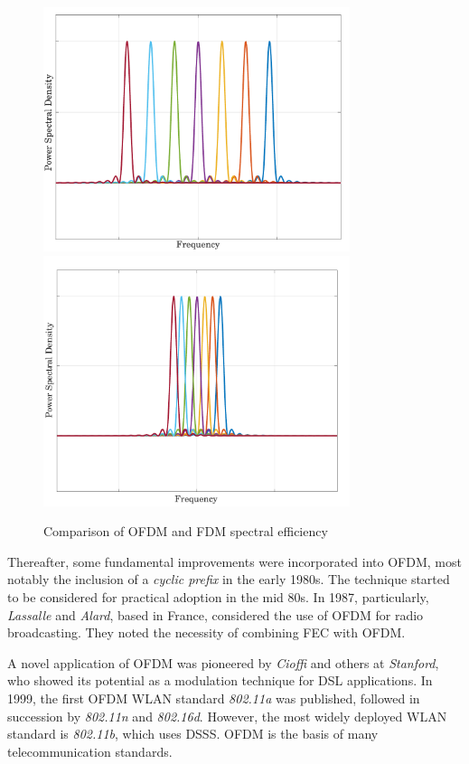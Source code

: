 \begin{figure}[!ht]
	\centering
	\includegraphics[width=0.8\textwidth]{Graphics/LiteratureReview/fdm.pdf}
	\includegraphics[width=0.8\textwidth]{Graphics/LiteratureReview/ofdmPSD.pdf}
	\caption{Comparison of OFDM and FDM spectral efficiency}
	\label{fig:litRev:fdm}
\end{figure}

Thereafter, some fundamental improvements were incorporated into OFDM, most notably the inclusion of a \emph{cyclic prefix} in the early 1980s\cite{xploreHistory}. The technique started to be considered for practical adoption in the mid 80s. In 1987, particularly, \emph{Lassalle} and \emph{Alard}, based in France, considered the use of OFDM for radio broadcasting. They noted the necessity of combining \gls{FEC} with \gls{OFDM}.

A novel application of OFDM was pioneered by \emph{Cioffi} and others at \emph{Stanford}, who showed its potential as a modulation technique for \gls{DSL} applications. In 1999, the first OFDM \gls{WLAN} standard \emph{802.11a} was published, followed in succession by \emph{802.11n} and \emph{802.16d}. However, the most widely deployed \gls{WLAN} standard is \emph{802.11b}, which uses \gls{DSSS}. OFDM is the basis of many telecommunication standards.

